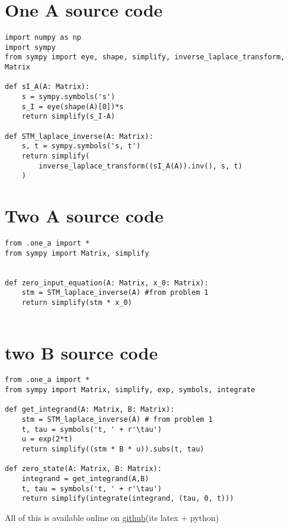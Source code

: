 \appendix

\section{One A source code} \label{appendix:one-a-src}
\begin{verbatim}
import numpy as np
import sympy
from sympy import eye, shape, simplify, inverse_laplace_transform, Matrix

def sI_A(A: Matrix):
    s = sympy.symbols('s')
    s_I = eye(shape(A)[0])*s
    return simplify(s_I-A)

def STM_laplace_inverse(A: Matrix):
    s, t = sympy.symbols('s, t')
    return simplify(
        inverse_laplace_transform((sI_A(A)).inv(), s, t)
    )
\end{verbatim}

\section{Two A source code} \label{appendix:two-a-src}
\begin{verbatim}
from .one_a import *
from sympy import Matrix, simplify


def zero_input_equation(A: Matrix, x_0: Matrix):
    stm = STM_laplace_inverse(A) #from problem 1 
    return simplify(stm * x_0)


\end{verbatim}

\section{two B source code} \label{appendix:two-b-src}
\begin{verbatim}
from .one_a import *
from sympy import Matrix, simplify, exp, symbols, integrate

def get_integrand(A: Matrix, B: Matrix):
    stm = STM_laplace_inverse(A) # from problem 1
    t, tau = symbols('t, ' + r'\tau')
    u = exp(2*t)
    return simplify((stm * B * u)).subs(t, tau)
    
def zero_state(A: Matrix, B: Matrix):
    integrand = get_integrand(A,B)
    t, tau = symbols('t, ' + r'\tau')
    return simplify(integrate(integrand, (tau, 0, t)))
\end{verbatim}


All of this is available online on \href{https://github.com/NathanRoseCE/ControlsClass}{github}(its latex +
python)